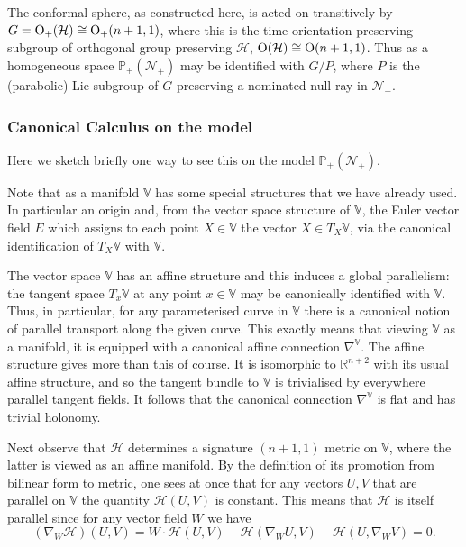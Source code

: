 \documentclass[a4paper,12pt]{amsart}
\def\cH{\mathcal{H}}
\def\cN{\mathcal{N}}
\theoremstyle{remark}
\begin{document}
The conformal sphere, as constructed here, is acted on transitively by
$G={\rm O}_+(\cH)\cong {\rm O}_+(n+1,1)$, where this is the time
orientation preserving subgroup of orthogonal group preserving
$\mathcal{H}$, ${\rm O}(\cH)\cong {\rm O}(n+1,1)$. Thus as a
homogeneous space $\mathbb{P}_+(\cN_+)$ may be identified with $G/P$,
where $P$ is the (parabolic) Lie subgroup of $G$ preserving a
nominated null ray in $\cN_+$. 



\subsubsection{Canonical Calculus on the model}\label{mc}
Here we sketch briefly one way to see this on the model
$\mathbb{P}_+(\cN_+)$.

Note that as a manifold $\mathbb{V}$ has some special structures that
we have already used. In particular an origin and, from the vector
space structure of $\mathbb{V}$, the Euler vector field $E$ which
assigns to each point $X\in \mathbb{V}$ the vector $X\in
T_X\mathbb{V}$, via the canonical identification of $T_X\mathbb{V}$
with $\mathbb{V}$.


The vector
space $\mathbb{V}$ has an affine structure and this induces a global
parallelism: the tangent space $T_x\mathbb{V}$ at any point $x\in
\mathbb{V}$ may be canonically identified with $\mathbb{V}$.  Thus, in
particular, for any parameterised curve in $\mathbb{V}$ there is a
canonical notion of parallel transport along the given curve. This
exactly means that viewing $\mathbb{V}$ as a manifold, it is equipped
with a canonical affine connection $\nabla^{\mathbb{V}}$. The affine
structure gives more than this of course. It is isomorphic to
$\mathbb{R}^{n+2}$ with its usual affine structure, and so the tangent
bundle to $\mathbb{V}$ is trivialised by everywhere parallel tangent
fields. It follows that the canonical connection $\nabla^{\mathbb{V}}$
is flat and has trivial holonomy.


Next observe that $\cH$ determines a signature $(n+1,1)$ metric on
$\mathbb{V}$, where the latter is viewed as an affine manifold. By the
definition of its promotion from bilinear form to metric, one sees at
once that for any vectors $U,V$ that are parallel on $\mathbb{V}$ the
quantity $\cH(U,V)$ is constant. This means that $\cH$ is itself
parallel since for any vector field $W$ we have
$$
(\nabla_W \cH)(U,V)= W\cdot \cH(U,V)- \cH(\nabla_W U,V)- \cH( U,\nabla_W V)=0.
$$
\end{document}
